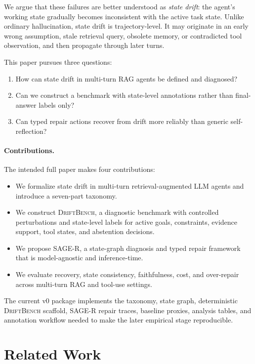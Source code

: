 \documentclass[letterpaper]{article}
\begin{document}
We argue that these failures are better understood as \emph{state drift}: the agent's working state gradually becomes inconsistent with the active task state. Unlike ordinary hallucination, state drift is trajectory-level. It may originate in an early wrong assumption, stale retrieval query, obsolete memory, or contradicted tool observation, and then propagate through later turns.

This paper pursues three questions:

\begin{enumerate}
    \item How can state drift in multi-turn RAG agents be defined and diagnosed?
    \item Can we construct a benchmark with state-level annotations rather than final-answer labels only?
    \item Can typed repair actions recover from drift more reliably than generic self-reflection?
\end{enumerate}

\paragraph{Contributions.}
The intended full paper makes four contributions:
\begin{itemize}
    \item We formalize state drift in multi-turn retrieval-augmented LLM agents and introduce a seven-part taxonomy.
    \item We construct \textsc{DriftBench}, a diagnostic benchmark with controlled perturbations and state-level labels for active goals, constraints, evidence support, tool states, and abstention decisions.
    \item We propose \textsc{SAGE-R}, a state-graph diagnosis and typed repair framework that is model-agnostic and inference-time.
    \item We evaluate recovery, state consistency, faithfulness, cost, and over-repair across multi-turn RAG and tool-use settings.
\end{itemize}

The current v0 package implements the taxonomy, state graph, deterministic \textsc{DriftBench} scaffold, \textsc{SAGE-R} repair traces, baseline proxies, analysis tables, and annotation workflow needed to make the later empirical stage reproducible.

\section{Related Work}
\end{document}
